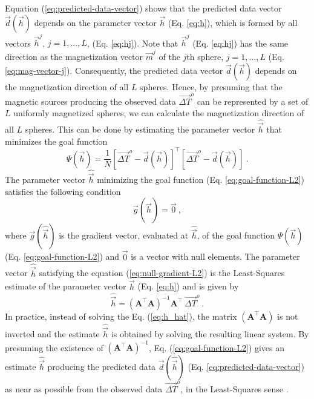 \documentclass[journal abbreviation, npg]{copernicus}
\begin{document}
Equation (\ref{eq:predicted-data-vector}) shows that the predicted data vector $\vec{d}(\vec{h})$ depends on the parameter vector $\vec{h}$ (Eq. \ref{eq:h}), which is formed by all vectors $\vec{h}^{j}$, $j = 1, ..., L$, (Eq. \ref{eq:hj}). Note that $\vec{h}^{j}$ (Eq. \ref{eq:hj}) has the same direction as the magnetization vector $\vec{m}^{j}$ of the $j$th sphere, $j = 1, ..., L$ (Eq. \ref{eq:mag-vector-j}). Consequently, the predicted data vector $\vec{d}(\vec{h})$ depends on the magnetization direction of all $L$ spheres. Hence, by presuming that the magnetic sources producing the observed data $\vec{\Delta T}^{o}$ can be represented by a set of $L$ uniformly magnetized spheres, we can calculate the magnetization direction of all $L$ spheres. This can be done by estimating the parameter vector $\hat{\vec{h}}$ that minimizes the goal function
\begin{equation}
\Psi(\vec{h}) = \frac{1}{N}[\vec{\Delta T}^{o} - \vec{d}(\vec{h})]^{\intercal}[\vec{\Delta T}^{o} - \vec{d}(\vec{h})] \: .
\label{eq:goal-function-L2}
\end{equation}
The parameter vector $\hat{\vec{h}}$ minimizing the goal function (Eq. \ref{eq:goal-function-L2}) satisfies the following condition
\begin{equation}
\vec{g}(\hat{\vec{h}}) = \vec{0} \: ,
\label{eq:null-gradient-L2}
\end{equation}
where $\vec{g}(\hat{\vec{h}})$ is the gradient vector, evaluated at $\hat{\vec{h}}$, of the goal function $\Psi(\vec{h})$ (Eq. \ref{eq:goal-function-L2}) and $\vec{0}$ is a vector with null elements. The parameter vector $\hat{\vec{h}}$ satisfying the equation (\ref{eq:null-gradient-L2}) is the Least-Squares estimate of the parameter vector $\vec{h}$ (Eq. \ref{eq:h}) and is given by
\begin{equation}
\hat{\vec{h}} = (\mathbf{A}^{\intercal}\mathbf{A})^{-1} \mathbf{A}^{\intercal} \: \vec{\Delta T}^{o} \: .
\label{eq:h_hat}
\end{equation}
In practice, instead of solving the Eq. (\ref{eq:h_hat}), the matrix $(\mathbf{A}^{\intercal} \mathbf{A})$ is not inverted and the estimate $\hat{\vec{h}}$ is obtained by solving the resulting linear system. By presuming the existence of $(\mathbf{A}^{\intercal} \mathbf{A})^{-1}$, Eq. (\ref{eq:goal-function-L2}) gives an estimate $\hat{\vec{h}}$ producing the predicted data $\vec{d}(\hat{\vec{h}})$ (Eq. \ref{eq:predicted-data-vector}) as near as possible from the observed data $\vec{\Delta T}^{o}$, in the Least-Squares sense \citep{bard1973, twomey1977, menke1989, aster-etal2005}.
\end{document}
